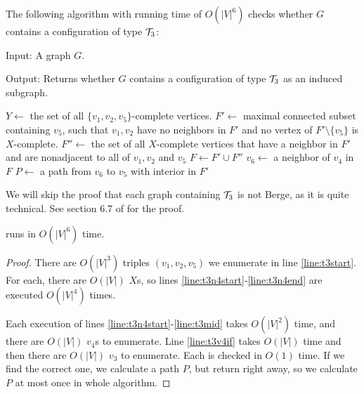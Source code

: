 The following algorithm with running time of $O(|V|^6)$ checks whether $G$ contains a configuration of type $\mathcal{T}_3$:

\begin{alg}
	\label{alg:t3}
	Input: A graph $G$.

	\noindent Output: Returns whether $G$ contains a configuration of type $\mathcal{T}_3$ as an induced subgraph.
\end{alg}

\begin{algorithmic}[1]
		\ls $Y \gets$ the set of all $\{v_1, v_2, v_5\}$-complete vertices.
			\ls $F' \gets$ maximal connected subset containing $v_5$, such that $v_1, v_2$ \label{line:t3n4start}
			\lsx have no neighbors in $F'$ and no vertex of $F'\setminus\{v_5\}$ is $X$-complete.
			\ls $F'' \gets$ the set of all $X$-complete vertices that have a neighbor in 
			\lsx $F'$ and are nonadjacent to all of $v_1, v_2$ and $v_5$
			\ls $F \gets F' \cup F''$ \label{line:t3mid}
					\ls $v_6 \gets$ a neighbor of $v_4$ in $F$
							\ls $P \gets$ a path from $v_6$ to $v_5$ with interior in $F'$
							\ls \RETURN \TRUE {}
						\mEndIf
					\mEndFor
				\mEndIf
			\mEndFor \label{line:t3n4end}
		\mEndFor
	\mEndFor
	\ls \RETURN \FALSE
	\mEndProcedure
\end{algorithmic}

We will skip the proof that each graph containing $\mathcal{T}_3$ is not Berge, as it is quite technical. See section 6.7 of \cite{MC05} for the proof.

\begin{theorem}
	 runs in $O(|V|^6)$ time.
\end{theorem}
\begin{proof}
	There are $O(|V|^3)$ triples $(v_1, v_2, v_5)$ we enumerate in line \ref{line:t3start}. For each, there are $O(|V|)$ $X$s, so lines \ref{line:t3n4start}-\ref{line:t3n4end} are executed $O(|V|^4)$ times.

	Each execution of lines \ref{line:t3n4start}-\ref{line:t3mid} takes $O(|V|^2)$ time, and there are $O(|V|)$ $v_4$s to enumerate. Line \ref{line:t3v4if} takes $O(|V|)$ time and then there are $O(|V|)$ $v_3$ to enumerate. Each is checked in $O(1)$ time. If we find the correct one, we calculate a path $P$, but return right away, so we calculate $P$ at most once in whole algorithm.
\end{proof}

